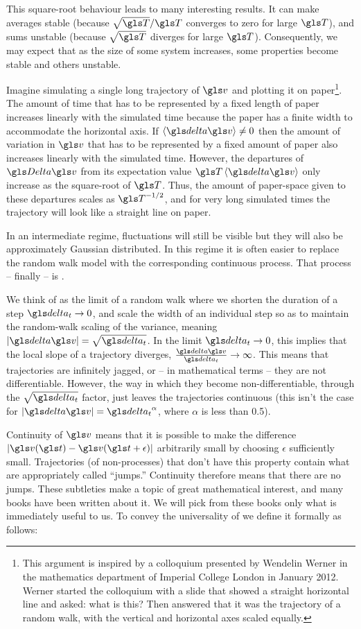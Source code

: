 This square-root behaviour leads to many interesting
results. It can make averages stable (because $\sqrt{\T}/\T$ converges to zero for large $\T$), 
and sums unstable (because $\sqrt{\T}$ diverges for large $\T$). Consequently, we may expect that as the size of some system increases, some properties become stable and others unstable.

Imagine simulating a single long trajectory of $\gv$ and plotting it on paper\footnote{This argument is
inspired by a colloquium presented by Wendelin Werner in the mathematics department of Imperial 
College London in January 2012. 
Werner started the colloquium with a slide that showed a straight horizontal line and asked: what is this? 
Then answered that it was the trajectory of a random walk, with the vertical and horizontal axes scaled equally.}. 
The amount of 
time that has to be represented by a fixed length of paper increases linearly with the simulated time
because the paper has a finite width to accommodate the horizontal axis. 
If $\ave{\d \gv} \neq 0$ then the amount of variation in $\gv$ that has to be represented by a fixed
amount of paper also increases linearly with the simulated time. However, the departures of $\D\gv$ from
its expectation value $\T \ave{\d \gv}$ only increase as the square-root of $\T$. Thus, the 
amount of paper-space given to these departures scales as $\T^{-1/2}$, and for very long simulated
times the trajectory will look like a straight line on paper.

In an intermediate regime, fluctuations will still be visible but they will also be approximately 
Gaussian distributed. In this regime it is often easier to replace the random walk model 
with the corresponding continuous process. That process -- finally -- is \BM. 

We think of \BM
as the limit of a random walk where we shorten the duration of a step $\dt \to 0$, and 
scale the width of an individual step so as to maintain the random-walk scaling of the variance, meaning
$|\d\gv|=\sqrt{\dt}$. In the limit $\dt\to0$, this implies that the local slope of a \BM trajectory diverges, 
$\frac{\d\gv}{\dt}\to\infty$. This means that \BM trajectories 
are infinitely jagged, or -- in mathematical terms -- they are not differentiable. However, the way in
which they become non-differentiable, through the $\sqrt{\dt}$ factor, just leaves the 
trajectories continuous (this isn't the case for $|\d\gv|=\dt^\alpha$, where $\alpha$ is less than 0.5). 

Continuity of $\gv$ 
means that it is possible to make the difference $|\gv(\t)-\gv(\t+\epsilon)|$ arbitrarily small by choosing
$\epsilon$ sufficiently small. Trajectories (of non-\BM processes) that don't have this property contain what 
are appropriately called ``jumps.'' Continuity therefore means that there are no jumps. These subtleties make \BM 
a topic of great mathematical interest, and many books have been written about it. We will pick from 
these books only what is immediately useful to us. To convey the universality of \BM we define it formally as follows:

